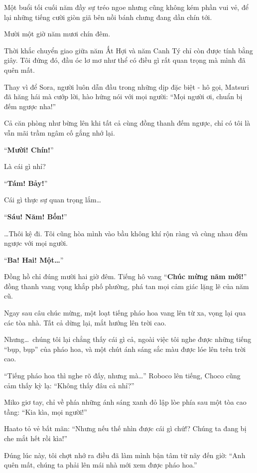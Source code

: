 \documentclass[../main.tex]{subfiles}
\begin{document}
Một buổi tối cuối năm đầy sự tréo ngoe nhưng cũng không kém phần vui vẻ, để lại những tiếng cười giòn giã bên nồi bánh chưng đang dần chín tới.

\ct

Mười một giờ năm mươi chín đêm.

Thời khắc chuyển giao giữa năm Ất Hợi và năm Canh Tý chỉ còn được tính bằng giây. Tôi đứng đó, đầu óc lơ mơ như thể có điều gì rất quan trọng mà mình đã quên mất.

Thay vì để Sora, người luôn dẫn đầu trong những dịp đặc biệt - hô gọi, Matsuri đã hăng hái mà cướp lời, hào hứng nói với mọi người: ``Mọi người ơi, chuẩn bị đếm ngược nha!''

Cả căn phòng như bừng lên khi tất cả cùng đồng thanh đếm ngược, chỉ có tôi là vẫn mãi trầm ngâm cố gắng nhớ lại.

``\textbf{Mười! Chín!}''

Là cái gì nhỉ?

``\textbf{Tám! Bảy!}''

Cái gì thực sự quan trọng lắm\dots

``\textbf{Sáu! Năm! Bốn!}''

\dots Thôi kệ đi. Tôi cũng hòa mình vào bầu không khí rộn ràng và cùng nhau đếm ngược với mọi người.


``\textbf{Ba! Hai! Một\dots}''

Đồng hồ chỉ đúng mười hai giờ đêm. Tiếng hô vang ``\textbf{Chúc mừng năm mới!}'' đồng thanh vang vọng khắp phố phường, phá tan mọi cảm giác lặng lẽ của năm cũ.

Ngay sau câu chúc mừng, một loạt tiếng pháo hoa vang lên từ xa, vọng lại qua các tòa nhà. Tất cả dừng lại, mắt hướng lên trời cao.

Nhưng\dots\ chúng tôi lại chẳng thấy cái gì cả, ngoài việc tôi nghe được những tiếng ``bụp, bụp'' của pháo hoa, và một chút ánh sáng sắc màu được lóe lên trên trời cao.

``Tiếng pháo hoa thì nghe rõ đấy, nhưng mà\dots'' Roboco lên tiếng, Choco cũng cảm thấy kỳ lạ: ``Không thấy đâu cả nhỉ?''

Miko giơ tay, chỉ về phía những ánh sáng xanh đỏ lập lòe phía sau một tòa cao tầng: ``Kia kìa, mọi người!''

Haato tỏ vẻ bất mãn: ``Nhưng nếu thế nhìn được cái gì chứ!? Chúng ta đang bị che mắt hết rồi kìa!''

Đúng lúc này, tôi chợt nhớ ra điều đã làm mình bận tâm từ nãy đến giờ: ``Anh quên mất, chúng ta phải lên mái nhà mới xem được pháo hoa.''
\end{document}
